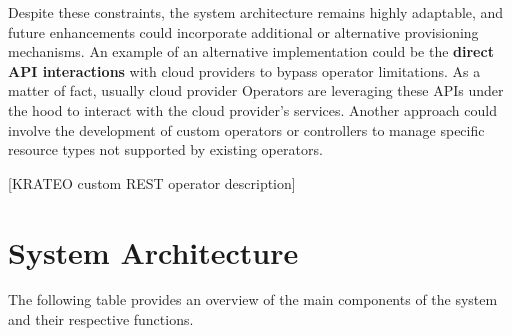Despite these constraints, the system architecture remains highly adaptable, and future enhancements could incorporate additional or alternative provisioning mechanisms. 
An example of an alternative implementation could be the \textbf{direct API interactions} with cloud providers to bypass operator limitations. As a matter of fact, usually cloud provider Operators are leveraging these APIs under the hood to interact with the cloud provider’s services.
Another approach could involve the development of custom operators or controllers to manage specific resource types not supported by existing operators. 

[KRATEO custom REST operator description]

\newpage

\section{System Architecture}
\label{sec:system_architecture}

The following table provides an overview of the main components of the system and their respective functions.

